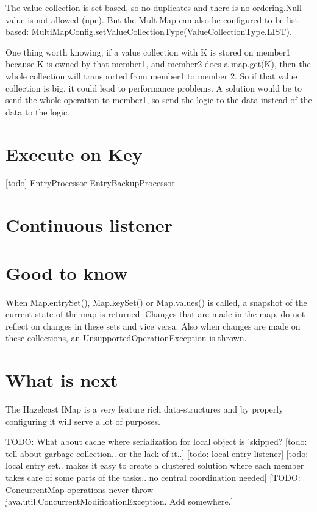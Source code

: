 The value collection is set based, so no duplicates and there is no ordering.Null value is not allowed (npe). But the MultiMap can also be configured to be list based: MultiMapConfig.setValueCollectionType(ValueCollectionType.LIST). 

One thing worth knowing; if a value collection with K is stored on member1 because K is owned by that member1, and member2 does a map.get(K), then the whole collection will transported from member1 to member 2. So if that value collection is big, it could lead to performance problems. A solution would be to send the whole operation to member1, so send the logic to the data instead of the data to the logic.

\section{Execute on Key}
[todo]
EntryProcessor
EntryBackupProcessor

\section{Continuous listener}

\section{Good to know}

When Map.entrySet(), Map.keySet() or Map.values() is called, a snapshot of the current state of the map is returned. Changes that are made in the map, do not reflect on changes in these sets and vice versa. Also when changes are made on these collections, an UnsupportedOperationException is thrown.

\section{What is next}
The Hazelcast IMap is a very feature rich data-structures and by properly configuring it will serve a lot of purposes.

TODO: What about cache where serialization for local object is 'skipped?
[todo: tell about garbage collection.. or the lack of it..]
[todo: local entry listener]
[todo: local entry set.. makes it easy to create a clustered solution where each member takes care of some parts of the tasks.. no central coordination needed]
[TODO: ConcurrentMap operations never throw java.util.ConcurrentModificationException. Add somewhere.]


